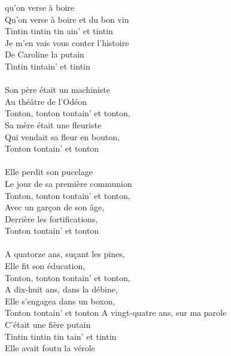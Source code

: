 
 qu'on verse à boire
\\Qu'on verse à boire et du bon vin
\\Tintin tintin tin ain' et tintin
\\Je m'en vais vous conter l'histoire
\\De Caroline la putain
\\Tintin tintain' et tintin
\\\\Son père était un machiniste
\\Au théâtre de l'Odéon
\\Tonton, tonton tontain' et tonton,
\\Sa mère était une fleuriste
\\Qui vendait sa fleur en bouton,
\\Tonton tontain' et tonton
\\\\Elle perdit son pucelage
\\Le jour de sa première communion
\\Tonton, tonton tontain' et tonton,
\\Avec un garçon de son âge,
\\Derrière les fortifications,
\\Tonton tontain' et tonton
\\\\A quatorze ans, suçant les pines,
\\Elle fit son éducation,
\\Tonton, tonton tontain' et tonton,
\\A dix-huit ans, dans la débine,
\\Elle s'engagea dans un boxon,
\\Tonton tontain' et tonton
\breakpage
A vingt-quatre ans, sur ma parole
\\C'était une fière putain
\\Tintin tintin tin tain' et tintin
\\Elle avait foutu la vérole
